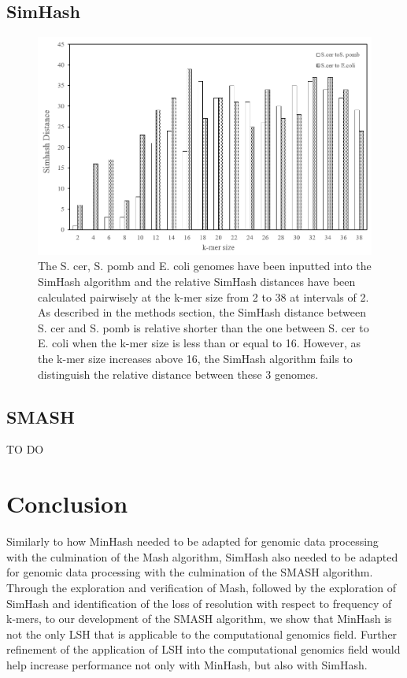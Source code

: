\documentclass[12pt, letterpaper]{article}
\begin{document}
\subsection{SimHash}
\FloatBarrier
\begin{figure}[h!]
	\centering
	\includegraphics[width=1.0\textwidth]{Simhash_kmer_result.png}
	\caption{The S. cer, S. pomb and E. coli genomes have been inputted into the SimHash algorithm and the relative SimHash distances have been calculated pairwisely at the k-mer size from 2 to 38 at intervals of 2. As described in the methods section, the SimHash distance between S. cer and S. pomb is relative shorter than the one between S. cer to E. coli when the k-mer size is less than or equal to 16. However, as the k-mer size increases above 16, the SimHash algorithm fails to distinguish the relative distance between these 3 genomes.}
	\label{fig:SimHashDescription}
\end{figure}
\FloatBarrier


\subsection{SMASH}
\color{red} TO DO \color{black}
\section{Conclusion}
Similarly to how MinHash needed to be adapted for genomic data processing with the culmination of the Mash algorithm, SimHash also needed to be adapted for genomic data processing with the culmination of the SMASH algorithm. Through the exploration and verification of Mash, followed by the exploration of SimHash and identification of the loss of resolution with respect to frequency of k-mers, to our development of the SMASH algorithm, we show that MinHash is not the only LSH that is applicable to the computational genomics field. Further refinement of the application of LSH into the computational genomics field would help increase performance not only with MinHash, but also with SimHash.
\end{document}
